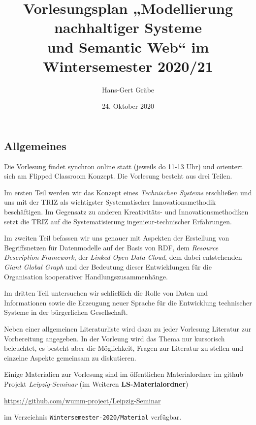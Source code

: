 \documentclass[11pt,a4paper]{article}
\title{Vorlesungsplan „Modellierung nachhaltiger Systeme\\ und Semantic Web“
  im Wintersemester 2020/21}
\author{Hans-Gert Gr\"abe}
\date{24. Oktober 2020}
\begin{document}
\maketitle
\subsection{Allgemeines}

Die Vorlesung findet synchron online statt (jeweils do 11-13 Uhr) und
orientert sich am Flipped Classroom Konzept. Die Vorlesung besteht aus drei
Teilen.

Im ersten Teil werden wir das Konzept eines \emph{Technischen Systems}
erschließen und uns mit der TRIZ als wichtigster Systematischer
Innovationsmethodik beschäftigen.  Im Gegensatz zu anderen Kreativitäts- und
Innovationsmethodiken setzt die TRIZ auf die Systematisierung
ingenieur-technischer Erfahrungen. 

Im zweiten Teil befassen wir uns genauer mit Aspekten der Erstellung von
Begriffsnetzen für Datenmodelle auf der Basis von RDF, dem \emph{Resource
  Description Framework}, der \emph{Linked Open Data Cloud}, dem dabei
entstehenden \emph{Giant Global Graph} und der Bedeutung dieser Entwicklungen
für die Organisation kooperativer Handlungszusammenhänge.

Im dritten Teil untersuchen wir schließlich die Rolle von Daten und
Informationen sowie die Erzeugung neuer Sprache für die Entwicklung
technischer Systeme in der bürgerlichen Gesellschaft.

Neben einer allgemeinen Literaturliste wird dazu zu jeder Vorlesung Literatur
zur Vorbereitung angegeben. In der Vorleung wird das Thema nur kursorisch
beleuchtet, es besteht aber die Möglichkeit, Fragen zur Literatur zu stellen
und einzelne Aspekte gemeinsam zu diskutieren.

Einige Materialien zur Vorlesung sind im öffentlichen Materialordner im github
Projekt \emph{Leipzig-Seminar} (im Weiteren \textbf{LS-Materialordner})
\begin{center}
  \url{https://github.com/wumm-project/Leipzig-Seminar}
\end{center}
im Verzeichnis \texttt{Wintersemester-2020/Material} verfügbar.
\end{document}
